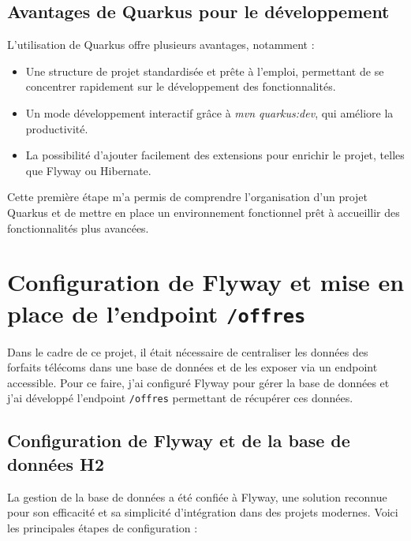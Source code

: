 \documentclass[11pt]{article}
\begin{document}
		\subsection{Avantages de Quarkus pour le développement}
		
		L’utilisation de Quarkus offre plusieurs avantages, notamment :
		\begin{itemize}
			\item Une structure de projet standardisée et prête à l’emploi, permettant de se concentrer rapidement sur le développement des fonctionnalités.
			\item Un mode développement interactif grâce à \textit{mvn quarkus:dev}, qui améliore la productivité.
			\item La possibilité d’ajouter facilement des extensions pour enrichir le projet, telles que Flyway ou Hibernate.
		\end{itemize}
		
		Cette première étape m’a permis de comprendre l’organisation d’un projet Quarkus et de mettre en place un environnement fonctionnel prêt à accueillir des fonctionnalités plus avancées.
		
		\section{Configuration de Flyway et mise en place de l'endpoint \texttt{/offres}}
		
		Dans le cadre de ce projet, il était nécessaire de centraliser les données des forfaits télécoms dans une base de données et de les exposer via un endpoint accessible. Pour ce faire, j'ai configuré Flyway pour gérer la base de données et j'ai développé l'endpoint \texttt{/offres} permettant de récupérer ces données.
		
		\subsection{Configuration de Flyway et de la base de données H2}
		
		La gestion de la base de données a été confiée à Flyway, une solution reconnue pour son efficacité et sa simplicité d'intégration dans des projets modernes. Voici les principales étapes de configuration :
		
\end{document}
